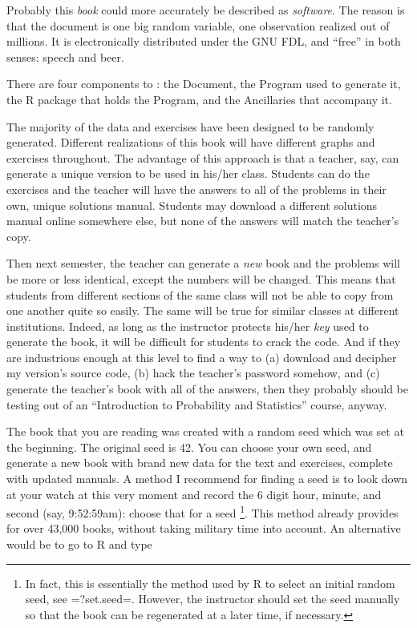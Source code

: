 \documentclass[captions=tableheading]{scrbook}
\begin{document}
\label{cha:Instructions-for-Instructors}




Probably this \emph{book} could more accurately be described as \emph{software}. The reason is that the document is one big random variable, one observation realized out of millions. It is electronically distributed under the GNU FDL, and ``free'' in both senses: speech and beer.  

There are four components to \IPSUR: the Document, the Program used to generate it, the \textsf{R} package that holds the Program, and the Ancillaries that accompany it.

The majority of the data and exercises have been designed to be randomly generated. Different realizations of this book will have different graphs and exercises throughout. The advantage of this approach is that a teacher, say, can generate a unique version to be used in his/her class. Students can do the exercises and the teacher will have the answers to all of the problems in their own, unique solutions manual. Students may download a different solutions manual online somewhere else, but none of the answers will match the teacher's copy. 

Then next semester, the teacher can generate a \emph{new} book and the problems will be more or less identical, except the numbers will be changed. This means that students from different sections of the same class will not be able to copy from one another quite so easily. The same will be true for similar classes at different institutions. Indeed, as long as the instructor protects his/her \emph{key} used to generate the book, it will be difficult for students to crack the code. And if they are industrious enough at this level to find a way to (a) download and decipher my version's source code, (b) hack the teacher's password somehow, and (c) generate the teacher's book with all of the answers, then they probably should be testing out of an ``Introduction to Probability and Statistics'' course, anyway. 

The book that you are reading was created with a random seed which was set at the beginning. The original seed is 42. You can choose your own seed, and generate a new book with brand new data for the text and exercises, complete with updated manuals. A method I recommend for finding a seed is to look down at your watch at this very moment and record the 6 digit hour, minute, and second (say, 9:52:59am): choose that for a seed
\footnote{In fact, this is essentially the method used by \textsf{R} to select an initial random seed, see =?set.seed=. However, the instructor should set the seed manually so that the book can be regenerated at a later time, if necessary.}.
This method already provides for over 43,000 books, without taking military time into account. An alternative would be to go to \textsf{R} and type 
\end{document}
